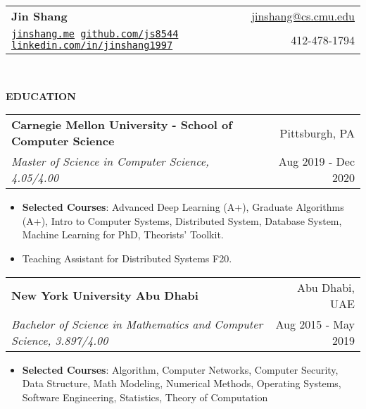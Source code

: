 \documentclass[letterpaper,11pt]{article}
\makeatletter
\newcommand{\resitem}[1]{\item  #1}
\newcommand{\resheading}[1]{{\large \colorbox{mygrey}{\begin{minipage}{\linewidth}{\textbf{#1 \vphantom{p\^{E}}}}\end{minipage}}}}
\newcommand{\ressubheading}[4]{
\begin{tabular*}{1.04\linewidth}{l@{\extracolsep{\fill}}r}
		\textbf{#1} & #2 \\
		\textit{#3} & #4 \\
\end{tabular*}\vspace{-6pt}}
\makeatother
\begin{document}
\newcommand{\mywebheader}{
\begin{tabular*}{7in}{l@{\extracolsep{\fill}}r}
	\textbf{{\LARGE Jin Shang}} & \href{mailto:jinshang@cs.cmu.edu}{jinshang@cs.cmu.edu}\\
	{\footnotesize \texttt{\href{https://jinshang.me}{jinshang.me} \hspace{1em} \href{https://github.com/js8544}{github.com/js8544} \hspace{1em} \href{https://linkedin.com/in/jinshang1997}{linkedin.com/in/jinshang1997}}}& 412-478-1794 \\
	\end{tabular*}
\\
\vspace{0.1in}}

\mywebheader

\resheading{EDUCATION}
	\begin{description}
		\item
			\ressubheading{Carnegie Mellon University - School of Computer Science}{Pittsburgh, PA}{Master of Science in Computer Science, 4.05/4.00} {Aug 2019 - Dec 2020}
			{ \footnotesize
				\begin{itemize}
					\resitem{\textbf{Selected Courses}: Advanced Deep Learning (A+), Graduate Algorithms (A+), Intro to Computer Systems, Distributed System, Database System, Machine Learning for PhD, Theorists' Toolkit.}
					\resitem{Teaching Assistant for Distributed Systems F20.}
				\end{itemize}
				}
		\item
			\ressubheading{New York University Abu Dhabi}{Abu Dhabi, UAE}{Bachelor of Science in Mathematics and Computer Science, 3.897/4.00} {Aug 2015 - May 2019}
				{ \footnotesize
				\begin{itemize}
					\resitem{\textbf{Selected Courses}: Algorithm, Computer Networks, Computer Security, Data Structure, Math Modeling, Numerical Methods, Operating Systems, Software Engineering, Statistics, Theory of Computation}
				\end{itemize}
				}
\begin{comment}
\end{comment}
	\end{description} %
\end{document}
